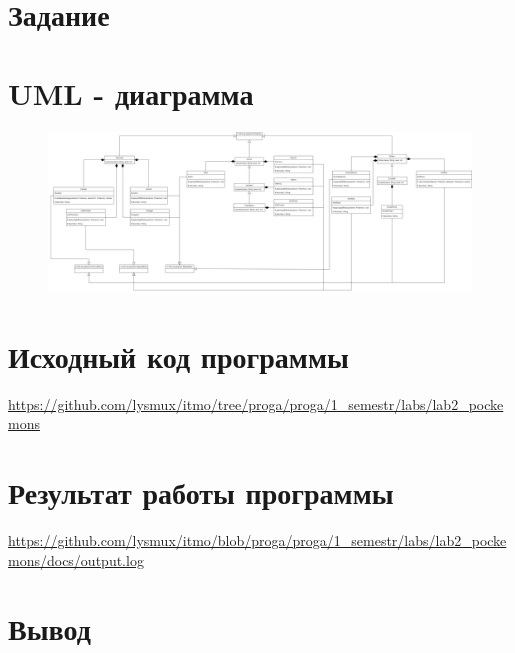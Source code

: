 


	
	
	\tableofcontents
	\newpage
	
	\section*{Задание}
	
	
	\section*{UML - диаграмма}
	\begin{figure}[h]
		\centering
		\hspace*{-2cm}
		\includegraphics[scale=0.19]{uml}
	\end{figure}
	
	\section*{Исходный код программы}
	\url{https://github.com/lysmux/itmo/tree/proga/proga/1_semestr/labs/lab2_pockemons}
	
	\section*{Результат работы программы}
	\url{https://github.com/lysmux/itmo/blob/proga/proga/1_semestr/labs/lab2_pockemons/docs/output.log}
	
	\section*{Вывод}
	
	
